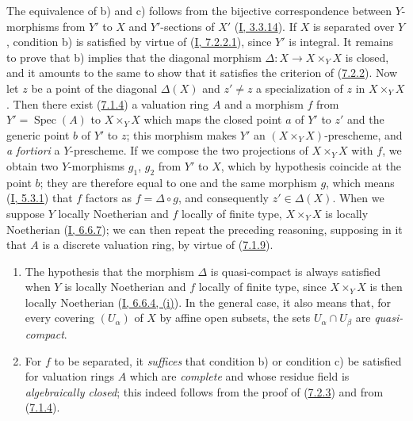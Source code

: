 The equivalence of b) and c) follows from the bijective correspondence between
$Y$-morphisms from $Y'$ to $X$ and $Y'$-sections of $X'$
(\hyperref[I.3.3.14]{I, 3.3.14}). If $X$ is separated over $Y$, condition b)
is satisfied by virtue of (\hyperref[I.7.2.2.1]{I, 7.2.2.1}), since $Y'$
is integral. It remains to prove that b) implies that the diagonal morphism
$\Delta:X\to X\times_YX$ is closed, and it amounts to the same to show that it
satisfies the criterion of (\hyperref[II.7.2.2]{7.2.2}). Now let $z$ be a
point of the diagonal $\Delta(X)$ and $z'\neq z$ a specialization of $z$ in
$X\times_YX$. Then there exist (\hyperref[II.7.1.4]{7.1.4}) a
valuation ring $A$ and a morphism $f$ from $Y'=\operatorname{Spec}(A)$ to
$X\times_YX$ which maps the closed point $a$ of $Y'$ to $z'$ and the generic
point $b$ of $Y'$ to $z$; this morphism makes $Y'$ an
$(X\times_YX)$-prescheme, and \emph{a fortiori} a $Y$-prescheme. If we compose
the two projections of $X\times_YX$ with $f$, we obtain two $Y$-morphisms
$g_1$, $g_2$ from $Y'$ to $X$, which by hypothesis coincide at the point $b$;
they are therefore equal to one and the same morphism $g$, which means
(\hyperref[I.5.3.1]{I, 5.3.1}) that $f$ factors as $f=\Delta\circ g$, and
consequently $z'\in\Delta(X)$. When we suppose $Y$ locally Noetherian and $f$
locally of finite type, $X\times_YX$ is locally Noetherian
(\hyperref[I.6.6.7]{I, 6.6.7}); we can then repeat the preceding
reasoning, supposing in it that $A$ is a discrete valuation ring, by virtue
of (\hyperref[II.7.1.9]{7.1.9}).

\begin{remark}[7.2.4]
\label{II.7.2.4}
\begin{enumerate}
\item[\rm (i)] The hypothesis that the morphism $\Delta$ is quasi-compact is
always satisfied when $Y$ is locally Noetherian and $f$ locally of
finite type, since $X\times_YX$ is then locally Noetherian
(\hyperref[I.6.6.4]{I, 6.6.4, (i)}). In the general case, it also means
that, for every covering $(U_\alpha)$ of $X$ by affine open subsets, the
sets $U_\alpha\cap U_\beta$ are \emph{quasi-compact}.
\item[\rm (ii)] For $f$ to be separated, it \emph{suffices} that condition b)
or condition c) be satisfied for valuation rings $A$ which are
\emph{complete} and whose residue field is \emph{algebraically closed};
this indeed follows from the proof of
(\hyperref[II.7.2.3]{7.2.3}) and from
(\hyperref[II.7.1.4]{7.1.4}).
\end{enumerate}
\end{remark}

